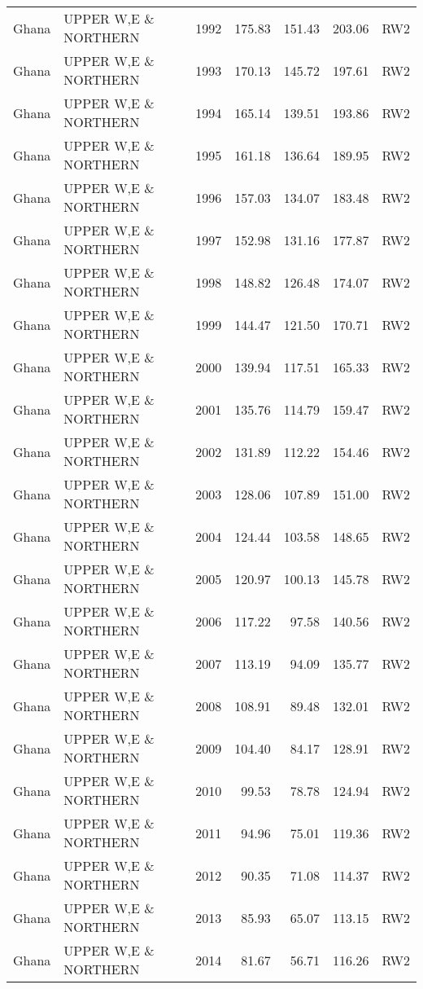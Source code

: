 \begin{longtable}{lllrrrl}
  Ghana & UPPER W,E \& NORTHERN & 1992 & 175.83 & 151.43 & 203.06 & RW2 \\ 
  Ghana & UPPER W,E \& NORTHERN & 1993 & 170.13 & 145.72 & 197.61 & RW2 \\ 
  Ghana & UPPER W,E \& NORTHERN & 1994 & 165.14 & 139.51 & 193.86 & RW2 \\ 
  Ghana & UPPER W,E \& NORTHERN & 1995 & 161.18 & 136.64 & 189.95 & RW2 \\ 
  Ghana & UPPER W,E \& NORTHERN & 1996 & 157.03 & 134.07 & 183.48 & RW2 \\ 
  Ghana & UPPER W,E \& NORTHERN & 1997 & 152.98 & 131.16 & 177.87 & RW2 \\ 
  Ghana & UPPER W,E \& NORTHERN & 1998 & 148.82 & 126.48 & 174.07 & RW2 \\ 
  Ghana & UPPER W,E \& NORTHERN & 1999 & 144.47 & 121.50 & 170.71 & RW2 \\ 
  Ghana & UPPER W,E \& NORTHERN & 2000 & 139.94 & 117.51 & 165.33 & RW2 \\ 
  Ghana & UPPER W,E \& NORTHERN & 2001 & 135.76 & 114.79 & 159.47 & RW2 \\ 
  Ghana & UPPER W,E \& NORTHERN & 2002 & 131.89 & 112.22 & 154.46 & RW2 \\ 
  Ghana & UPPER W,E \& NORTHERN & 2003 & 128.06 & 107.89 & 151.00 & RW2 \\ 
  Ghana & UPPER W,E \& NORTHERN & 2004 & 124.44 & 103.58 & 148.65 & RW2 \\ 
  Ghana & UPPER W,E \& NORTHERN & 2005 & 120.97 & 100.13 & 145.78 & RW2 \\ 
  Ghana & UPPER W,E \& NORTHERN & 2006 & 117.22 & 97.58 & 140.56 & RW2 \\ 
  Ghana & UPPER W,E \& NORTHERN & 2007 & 113.19 & 94.09 & 135.77 & RW2 \\ 
  Ghana & UPPER W,E \& NORTHERN & 2008 & 108.91 & 89.48 & 132.01 & RW2 \\ 
  Ghana & UPPER W,E \& NORTHERN & 2009 & 104.40 & 84.17 & 128.91 & RW2 \\ 
  Ghana & UPPER W,E \& NORTHERN & 2010 & 99.53 & 78.78 & 124.94 & RW2 \\ 
  Ghana & UPPER W,E \& NORTHERN & 2011 & 94.96 & 75.01 & 119.36 & RW2 \\ 
  Ghana & UPPER W,E \& NORTHERN & 2012 & 90.35 & 71.08 & 114.37 & RW2 \\ 
  Ghana & UPPER W,E \& NORTHERN & 2013 & 85.93 & 65.07 & 113.15 & RW2 \\ 
  Ghana & UPPER W,E \& NORTHERN & 2014 & 81.67 & 56.71 & 116.26 & RW2 \\ 

\end{longtable}

